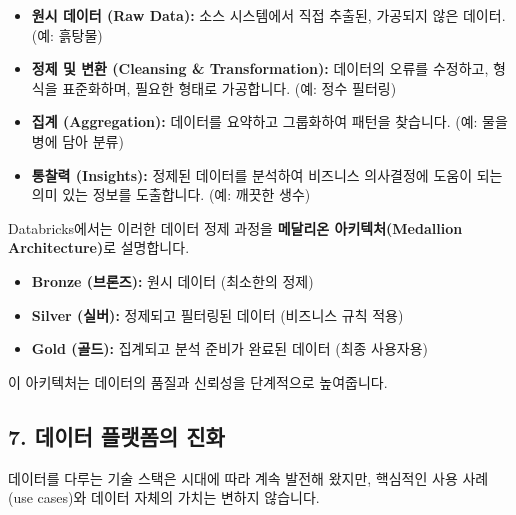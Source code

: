 \documentclass[11pt,a4paper]{article}
\begin{document}
\begin{itemize}
    \item \textbf{원시 데이터 (Raw Data):} 소스 시스템에서 직접 추출된, 가공되지 않은 데이터. (예: 흙탕물)
    \item \textbf{정제 및 변환 (Cleansing & Transformation):} 데이터의 오류를 수정하고, 형식을 표준화하며, 필요한 형태로 가공합니다. (예: 정수 필터링)
    \item \textbf{집계 (Aggregation):} 데이터를 요약하고 그룹화하여 패턴을 찾습니다. (예: 물을 병에 담아 분류)
    \item \textbf{통찰력 (Insights):} 정제된 데이터를 분석하여 비즈니스 의사결정에 도움이 되는 의미 있는 정보를 도출합니다. (예: 깨끗한 생수)
\end{itemize}

\begin{notebox}
Databricks에서는 이러한 데이터 정제 과정을 \textbf{메달리온 아키텍처(Medallion Architecture)}로 설명합니다.
\begin{itemize}
    \item \textbf{Bronze (브론즈):} 원시 데이터 (최소한의 정제)
    \item \textbf{Silver (실버):} 정제되고 필터링된 데이터 (비즈니스 규칙 적용)
    \item \textbf{Gold (골드):} 집계되고 분석 준비가 완료된 데이터 (최종 사용자용)
\end{itemize}
이 아키텍처는 데이터의 품질과 신뢰성을 단계적으로 높여줍니다.
\end{notebox}

\subsection*{7. 데이터 플랫폼의 진화}

데이터를 다루는 기술 스택은 시대에 따라 계속 발전해 왔지만, 핵심적인 사용 사례(use cases)와 데이터 자체의 가치는 변하지 않습니다.
\end{document}
